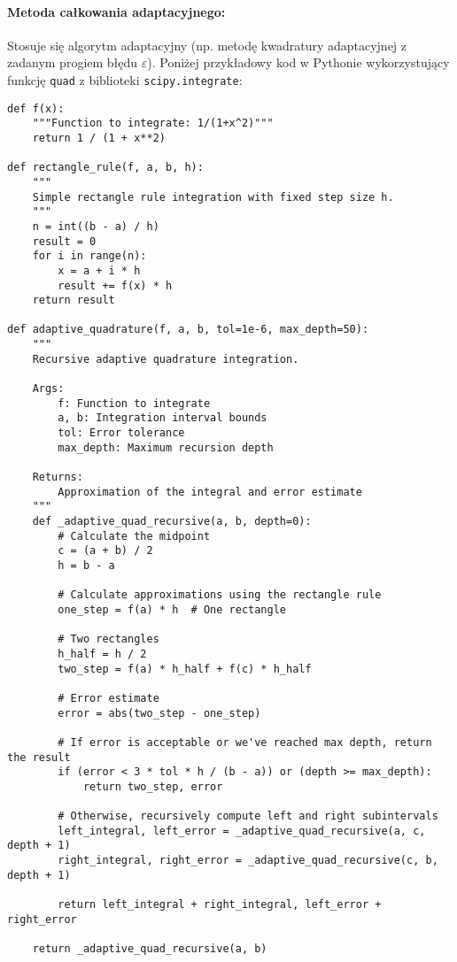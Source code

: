 \documentclass[a4paper,12pt]{article}
\begin{document}
\paragraph{Metoda całkowania adaptacyjnego:}
Stosuje się algorytm adaptacyjny (np. metodę kwadratury adaptacyjnej z zadanym progiem błędu \(\varepsilon\)). Poniżej przykładowy kod w Pythonie wykorzystujący funkcję \texttt{quad} z biblioteki \texttt{scipy.integrate}:

\begin{lstlisting}[caption={Obliczenie adaptacyjne całki import numpy as np}]
def f(x):
    """Function to integrate: 1/(1+x^2)"""
    return 1 / (1 + x**2)

def rectangle_rule(f, a, b, h):
    """
    Simple rectangle rule integration with fixed step size h.
    """
    n = int((b - a) / h)
    result = 0
    for i in range(n):
        x = a + i * h
        result += f(x) * h
    return result

def adaptive_quadrature(f, a, b, tol=1e-6, max_depth=50):
    """
    Recursive adaptive quadrature integration.
    
    Args:
        f: Function to integrate
        a, b: Integration interval bounds
        tol: Error tolerance
        max_depth: Maximum recursion depth
        
    Returns:
        Approximation of the integral and error estimate
    """
    def _adaptive_quad_recursive(a, b, depth=0):
        # Calculate the midpoint
        c = (a + b) / 2
        h = b - a
        
        # Calculate approximations using the rectangle rule
        one_step = f(a) * h  # One rectangle
        
        # Two rectangles
        h_half = h / 2
        two_step = f(a) * h_half + f(c) * h_half
        
        # Error estimate
        error = abs(two_step - one_step)
        
        # If error is acceptable or we've reached max depth, return the result
        if (error < 3 * tol * h / (b - a)) or (depth >= max_depth):
            return two_step, error
        
        # Otherwise, recursively compute left and right subintervals
        left_integral, left_error = _adaptive_quad_recursive(a, c, depth + 1)
        right_integral, right_error = _adaptive_quad_recursive(c, b, depth + 1)
        
        return left_integral + right_integral, left_error + right_error
    
    return _adaptive_quad_recursive(a, b)

\end{lstlisting}
\end{document}
